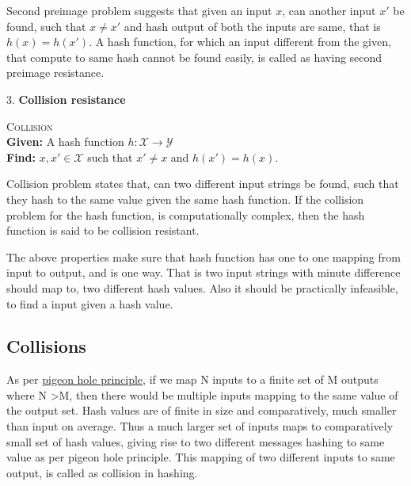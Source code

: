 Second preimage problem suggests that given an input $x$, can another input $x'$ be found, such that
$ x \neq x'$ and hash output of both the inputs are same, that is $h(x) = h(x')$. A hash function, for
which an input different from the given, that compute to same hash cannot be found easily, is 
called as having second preimage resistance.

3. {\bf Collision resistance}
\begin{center}
  \framebox
  {
    \parbox{300pt}
    {
      \centering \textsc{Collision} \\
      {\bf Given:} A hash function $h : \mathcal{X} \to \mathcal{Y}$ \\
      {\bf Find:} $x, x' \in \mathcal{X}$ such that $x' \neq x$ and $h(x') = h(x)$. 
    }
  }
\end{center}
\vspace{4mm}

Collision problem states that, can two different input strings be found, such that they hash to the
same value given the same hash function. If the collision problem for the hash function, is computationally
complex, then the hash function is said to be collision resistant.

The above properties make sure that hash function has one to one mapping from input to output, and is 
one way. That is two input strings with minute difference should map to, two different hash values. Also
it should be practically infeasible, to find a input given a hash value.

\subsection{Collisions}

As per \href{"http://en.wikipedia.org/wiki/Pigeonhole_principle"}{pigeon hole principle}, if we map N inputs 
to a finite set of M outputs where N \textgreater M, then there would be multiple inputs mapping to the same
value of the output set. Hash values are of finite in size and comparatively, much smaller than
input on average. Thus a much larger set of inputs maps to comparatively small set of hash values, giving
rise to two different messages hashing to same value as per pigeon hole principle. This mapping of two different
inputs to same output, is called as collision in hashing.

